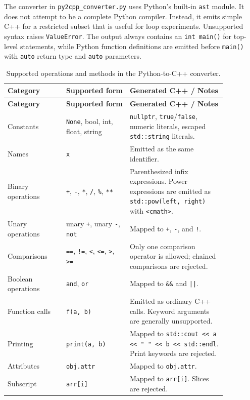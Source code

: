 \documentclass[11pt,a4paper]{article}
\newcommand{\modulepath}[1]{\texttt{#1}}
\begin{document}
The converter in \modulepath{py2cpp\_converter.py} uses Python's built-in
\texttt{ast} module. It does not attempt to be a complete Python compiler.
Instead, it emits simple C++ for a restricted subset that is useful for loop
experiments. Unsupported syntax raises \texttt{ValueError}. The output always
contains an \texttt{int main()} for top-level statements, while Python function
definitions are emitted before \texttt{main()} with \texttt{auto} return type
and \texttt{auto} parameters.

\begin{longtable}{p{0.23\linewidth}p{0.25\linewidth}p{0.38\linewidth}}
\caption{Supported operations and methods in the Python-to-C++ converter.}\\
\toprule
\textbf{Category} & \textbf{Supported form} & \textbf{Generated C++ / Notes}\\
\midrule
\endfirsthead
\toprule
\textbf{Category} & \textbf{Supported form} & \textbf{Generated C++ / Notes}\\
\midrule
\endhead
Constants & \texttt{None}, bool, int, float, string &
\texttt{nullptr}, \texttt{true}/\texttt{false}, numeric literals, escaped
\texttt{std::string} literals.\\
Names & \texttt{x} & Emitted as the same identifier.\\
Binary operations & \texttt{+}, \texttt{-}, \texttt{*}, \texttt{/},
\texttt{\%}, \texttt{**} & Parenthesized infix expressions. Power
expressions are emitted as \texttt{std::pow(left, right)} with
\texttt{<cmath>}.\\
Unary operations & unary \texttt{+}, unary \texttt{-}, \texttt{not} &
Mapped to \texttt{+}, \texttt{-}, and \texttt{!}.\\
Comparisons & \texttt{==}, \texttt{!=}, \texttt{<}, \texttt{<=},
\texttt{>}, \texttt{>=} & Only one comparison operator is allowed; chained
comparisons are rejected.\\
Boolean operations & \texttt{and}, \texttt{or} & Mapped to \texttt{\&\&} and
\texttt{||}.\\
Function calls & \texttt{f(a, b)} & Emitted as ordinary C++ calls. Keyword
arguments are generally unsupported.\\
Printing & \texttt{print(a, b)} & Mapped to \texttt{std::cout << a << " " << b
<< std::endl}. Print keywords are rejected.\\
Attributes & \texttt{obj.attr} & Mapped to \texttt{obj.attr}.\\
Subscript & \texttt{arr[i]} & Mapped to \texttt{arr[i]}. Slices are rejected.\\

\end{longtable}
\end{document}
